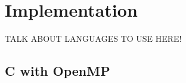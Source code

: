 \documentclass[11pt]{article} %
\begin{document}
\section{Implementation}

TALK ABOUT LANGUAGES TO USE HERE!


\subsection{C with OpenMP}

\end{document}
